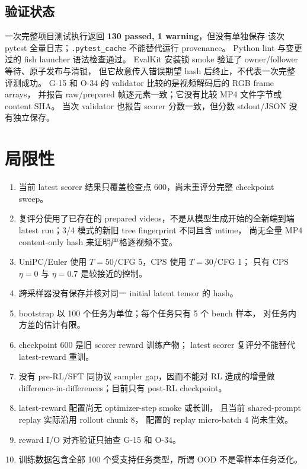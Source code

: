\documentclass[11pt,a4paper]{article}
\newcommand{\code}[1]{\texttt{#1}}
\begin{document}
\subsection{验证状态}

一次完整项目测试执行返回 \textbf{130 passed, 1 warning}，但没有单独保存
该次 pytest 全量日志；\code{.pytest\_cache} 不能替代运行 provenance。
Python lint 与变更过的 fish launcher 语法检查通过。
EvalKit 安装锁 smoke 验证了 owner/follower 等待、原子发布与清锁，
但它故意传入错误期望 hash 后终止，不代表一次完整评测成功。
G-15 和 O-34 的 validator 比较的是视频解码后的 RGB frame arrays，
并报告 raw/prepared 帧逐元素一致；它没有比较 MP4 文件字节或 content SHA。
当次 validator 也报告 scorer 分数一致，但分数 stdout/JSON 没有独立保存。

\section{局限性}

\begin{enumerate}
  \item 当前 latest scorer 结果只覆盖检查点 600，尚未重评分完整 checkpoint sweep。
  \item 复评分使用了已存在的 prepared videos，不是从模型生成开始的全新端到端
  latest run；3/4 模式的新旧 tree fingerprint 不同且含 mtime，
  尚无全量 MP4 content-only hash 来证明严格逐视频不变。
  \item UniPC/Euler 使用 $T=50$/CFG 5，CPS 使用 $T=30$/CFG 1；
  只有 CPS $\eta=0$ 与 $\eta=0.7$ 是较接近的控制。
  \item 跨采样器没有保存并核对同一 initial latent tensor 的 hash。
  \item bootstrap 以 100 个任务为单位；每个任务只有 5 个 bench 样本，
  对任务内方差的估计有限。
  \item checkpoint 600 是旧 scorer reward 训练产物；
  latest scorer 复评分不能替代 latest-reward 重训。
  \item 没有 pre-RL/SFT 同协议 sampler gap，因而不能对 RL 造成的增量做
  difference-in-differences；目前只有 post-RL checkpoint。
  \item latest-reward 配置尚无 optimizer-step smoke 或长训，
  且当前 shared-prompt replay 实际沿用 rollout chunk 8，
  配置的 replay micro-batch 4 尚未生效。
  \item reward I/O 对齐验证只抽查 G-15 和 O-34。
  \item 训练数据包含全部 100 个受支持任务类型，所谓 OOD 不是零样本任务泛化。
\end{enumerate}
\end{document}

